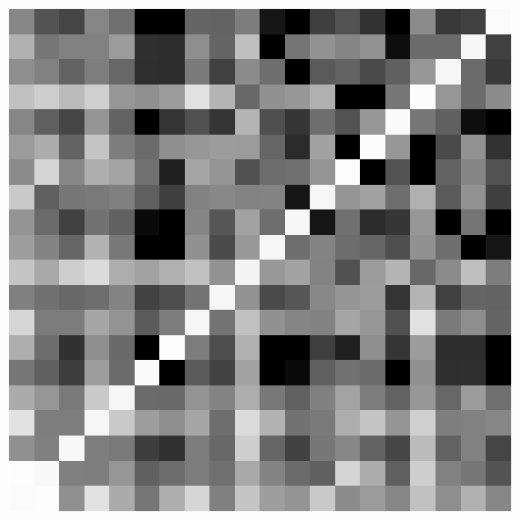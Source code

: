 \documentclass[14pt]{beamer}
\begin{document}

\begin{frame}[nofills]
\begin{center}
\includegraphics[height=0.9\textheight]{covariance-first-twenty.pdf}
\end{center}
\end{frame}
\end{document}
